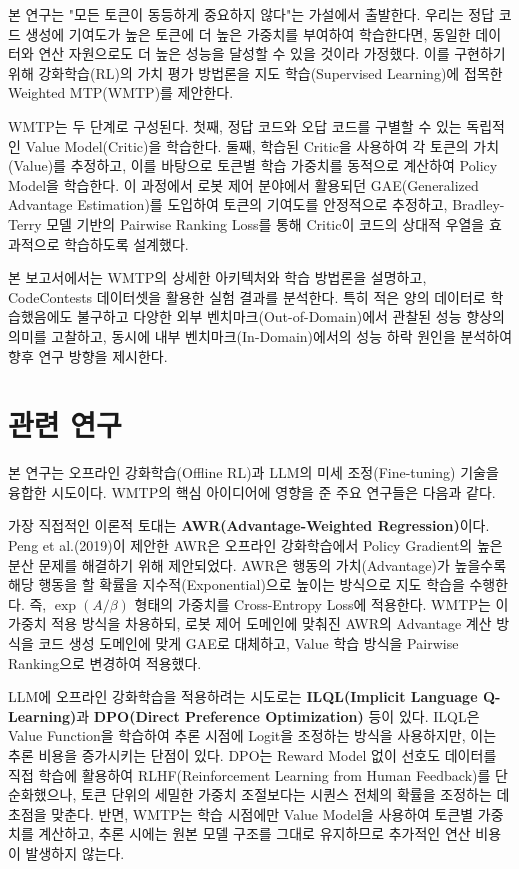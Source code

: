 \documentclass[11pt,a4paper]{article}
\begin{document}
본 연구는 "모든 토큰이 동등하게 중요하지 않다"는 가설에서 출발한다. 우리는 정답 코드 생성에 기여도가 높은 토큰에 더 높은 가중치를 부여하여 학습한다면, 동일한 데이터와 연산 자원으로도 더 높은 성능을 달성할 수 있을 것이라 가정했다. 이를 구현하기 위해 강화학습(RL)의 가치 평가 방법론을 지도 학습(Supervised Learning)에 접목한 Weighted MTP(WMTP)를 제안한다.

WMTP는 두 단계로 구성된다. 첫째, 정답 코드와 오답 코드를 구별할 수 있는 독립적인 Value Model(Critic)을 학습한다. 둘째, 학습된 Critic을 사용하여 각 토큰의 가치(Value)를 추정하고, 이를 바탕으로 토큰별 학습 가중치를 동적으로 계산하여 Policy Model을 학습한다. 이 과정에서 로봇 제어 분야에서 활용되던 GAE(Generalized Advantage Estimation)를 도입하여 토큰의 기여도를 안정적으로 추정하고, Bradley-Terry 모델 기반의 Pairwise Ranking Loss를 통해 Critic이 코드의 상대적 우열을 효과적으로 학습하도록 설계했다.

본 보고서에서는 WMTP의 상세한 아키텍처와 학습 방법론을 설명하고, CodeContests 데이터셋을 활용한 실험 결과를 분석한다. 특히 적은 양의 데이터로 학습했음에도 불구하고 다양한 외부 벤치마크(Out-of-Domain)에서 관찰된 성능 향상의 의미를 고찰하고, 동시에 내부 벤치마크(In-Domain)에서의 성능 하락 원인을 분석하여 향후 연구 방향을 제시한다.

\section{관련 연구}

본 연구는 오프라인 강화학습(Offline RL)과 LLM의 미세 조정(Fine-tuning) 기술을 융합한 시도이다. WMTP의 핵심 아이디어에 영향을 준 주요 연구들은 다음과 같다.

가장 직접적인 이론적 토대는 \textbf{AWR(Advantage-Weighted Regression)}이다. Peng et al.(2019)이 제안한 AWR은 오프라인 강화학습에서 Policy Gradient의 높은 분산 문제를 해결하기 위해 제안되었다. AWR은 행동의 가치(Advantage)가 높을수록 해당 행동을 할 확률을 지수적(Exponential)으로 높이는 방식으로 지도 학습을 수행한다. 즉, $\exp(A/\beta)$ 형태의 가중치를 Cross-Entropy Loss에 적용한다. WMTP는 이 가중치 적용 방식을 차용하되, 로봇 제어 도메인에 맞춰진 AWR의 Advantage 계산 방식을 코드 생성 도메인에 맞게 GAE로 대체하고, Value 학습 방식을 Pairwise Ranking으로 변경하여 적용했다.

LLM에 오프라인 강화학습을 적용하려는 시도로는 \textbf{ILQL(Implicit Language Q-Learning)}과 \textbf{DPO(Direct Preference Optimization)} 등이 있다. ILQL은 Value Function을 학습하여 추론 시점에 Logit을 조정하는 방식을 사용하지만, 이는 추론 비용을 증가시키는 단점이 있다. DPO는 Reward Model 없이 선호도 데이터를 직접 학습에 활용하여 RLHF(Reinforcement Learning from Human Feedback)를 단순화했으나, 토큰 단위의 세밀한 가중치 조절보다는 시퀀스 전체의 확률을 조정하는 데 초점을 맞춘다. 반면, WMTP는 학습 시점에만 Value Model을 사용하여 토큰별 가중치를 계산하고, 추론 시에는 원본 모델 구조를 그대로 유지하므로 추가적인 연산 비용이 발생하지 않는다.
\end{document}
